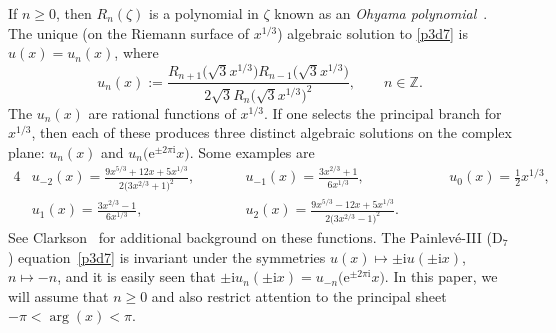 If $n\geq 0$, then $R_n(\zeta)$ is a polynomial in $\zeta$ known as an
\emph{Ohyama polynomial}~\cite{Ohyama:2006}. The unique \big(on the Riemann surface of $x^{1/3}$\big) algebraic solution to
\eqref{p3d7} is $u(x)=u_n(x)$, where
\begin{equation*}
u_n(x) := \frac{R_{n+1}\bigl(\sqrt{3}x^{1/3}\bigr)R_{n-1}\bigl(\sqrt{3}x^{1/3}\bigr)}{2\sqrt{3}R_n\bigl(\sqrt{3}x^{1/3}\bigr)^2},
\qquad n\in\mathbb{Z}.
\end{equation*}
The $u_n(x)$ are rational functions of $x^{1/3}$. If one selects the principal
branch for $x^{1/3}$, then each of these produces three distinct algebraic solutions
on the complex plane: $u_n(x)$ and $u_n\bigl(\mathrm{e}^{\pm 2\pi\mathrm{i}}x\bigr)$. Some
examples are
\begin{alignat*}{4}
& u_{-2}(x) = \frac{9x^{5/3}+12x+5x^{1/3}}{2\bigl(3x^{2/3}+1\bigr)^2}, \qquad &&
u_{-1}(x) = \frac{3x^{2/3}+1}{6x^{1/3}}, \qquad &&
u_0(x) = \frac{1}{2}x^{1/3},& \\
& u_1(x) = \frac{3x^{2/3}-1}{6x^{1/3}}, \qquad &&
u_2(x) = \frac{9x^{5/3}-12x+5x^{1/3}}{2\bigl(3x^{2/3}-1\bigr)^2}. \qquad &
\end{alignat*}
See Clarkson~\cite{Clarkson:2003} for additional background on these functions. The Painlev\'e-III (D$_7$) equation~\eqref{p3d7} is invariant under the symmetries $u(x)\mapsto \pm\mathrm{i} u(\pm\mathrm{i} x)$, $n\mapsto -n$, and it is easily seen that $\pm\mathrm{i} u_n(\pm\mathrm{i} x)=u_{-n}\bigl(\mathrm{e}^{\pm 2\pi\mathrm{i}} x\bigr)$.
In this paper, we will assume that $n\ge 0$ and also restrict attention to the principal sheet $-\pi<\arg(x)<\pi$.

